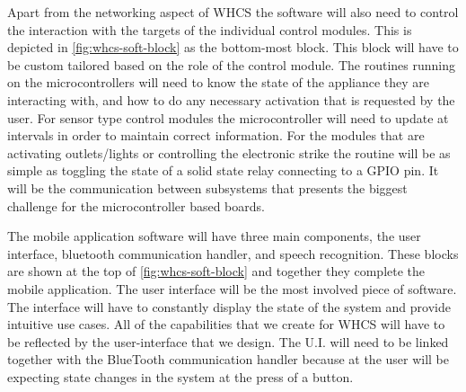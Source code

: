 {\color{black} Apart from the networking aspect of WHCS the software will also
need to control the interaction with the targets of the individual control
modules. This is depicted in \autoref{fig:whcs-soft-block} as the bottom{}-most block.
This block will have to be custom tailored based on the role of the control
module. The routines running on the microcontrollers will need to know the
state of the appliance they are interacting with, and how to do any necessary
activation that is requested by the user. For sensor type control modules the
microcontroller will need to update at intervals in order to maintain correct
information. For the modules that are activating outlets/lights or controlling
the electronic strike the routine will be as simple as toggling the state of a
solid state relay connecting to a GPIO pin. It will be the communication
between subsystems that presents the biggest challenge for the microcontroller
based boards.}

{\color{black} The mobile application software will have three main components,
the user interface, bluetooth communication handler, and speech recognition.
These blocks are shown at the top of \autoref{fig:whcs-soft-block} and together they
complete the mobile application. The user interface will be the most involved
piece of software. The interface will have to constantly display the state of
the system and provide intuitive use cases. All of the capabilities that we
create for WHCS will have to be reflected by the user{}-interface that we
design. The U.I. will need to be linked together with the BlueTooth
communication handler because at the user will be expecting state changes in
the system at the press of a button.}

